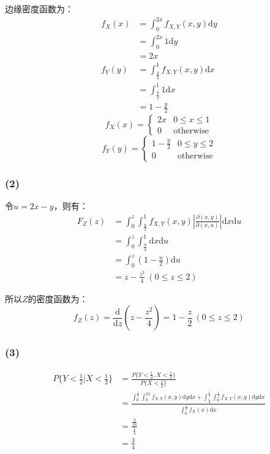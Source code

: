 \documentclass[a4paper,12pt]{ctexart}
\begin{document}
边缘密度函数为：
\begin{align*}
	f_X(x) &= \int_{0}^{2x} f_{X,Y}(x,y) \mathrm{d} y \\
	&= \int_{0}^{2x} 1 \mathrm{d} y \\
	&= 2x \\
	f_Y(y) &= \int_{\frac{y}{2}}^{1} f_{X,Y}(x,y) \mathrm{d} x \\
	&= \int_{\frac{y}{2}}^{1} 1 \mathrm{d} x \\
	&= 1 - \frac{y}{2}
\end{align*}
\begin{equation*}
	f_X(x) = 
	\begin{cases}
		2x & 0 \leq x \leq 1 \\
		0 & \text{otherwise}
	\end{cases}
\end{equation*}
\begin{equation*}
	f_Y(y) = 
	\begin{cases}
		1 - \frac{y}{2} & 0 \leq y \leq 2 \\
		0 & \text{otherwise}
	\end{cases}
\end{equation*}

\subsubsection*{(2)}

令$u = 2x-y$，则有：
\begin{align*}
	F_Z(z) &= \int_0^z \int_{\frac{u}{2}}^1 f_{X,Y}(x,y) \left| \frac{\partial(x,y)}{\partial(x,u)} \right| \mathrm{d} x \mathrm{d} u \\ 
	&= \int_0^z \int_{\frac{u}{2}}^1 \mathrm{d} x \mathrm{d} u \\
	&= \int_0^z \left(1 - \frac{u}{2}\right) \mathrm{d} u \\
	&= z - \frac{z^2}{4}\ (0 \leq z \leq 2)
\end{align*}

所以$Z$的密度函数为：
\begin{equation*}
	f_Z(z) = \frac{\mathrm{d}}{\mathrm{d}z} \left(z - \frac{z^2}{4}\right) = 1 - \frac{z}{2} \ (0 \leq z \leq 2)
\end{equation*}

\subsubsection*{(3)}

\begin{align*}
	P\{Y < \frac{1}{2} | X < \frac{1}{2}\} &= \frac{P\{Y < \frac{1}{2}, X < \frac{1}{2}\}}{P\{X < \frac{1}{2}\}} \\
	&= \frac{\int_0^{\frac{1}{4}} \int_0^{2x} f_{X,Y}(x,y) \mathrm{d} y \mathrm{d} x + \int_{\frac{1}{4}}^{\frac{1}{2}} \int_{0}^{\frac{1}{2}} f_{X,Y}(x,y) \mathrm{d} y \mathrm{d} x}{\int_0^{\frac{1}{2}} f_X(x) \mathrm{d} x} \\
	&= \frac{\frac{3}{16}}{\frac{1}{4}} \\
	&= \frac{3}{4}
\end{align*}
\end{document}
